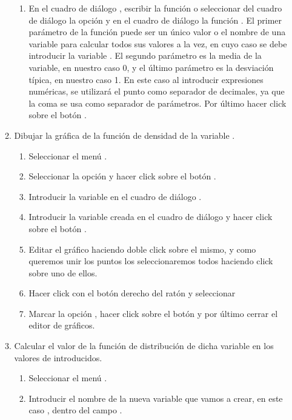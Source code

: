 \begin{enumerate}[leftmargin=*]
\begin{enumerate}
\begin{indicacion}
\begin{enumerate}
\item En el cuadro de diálogo , escribir la 
función  o seleccionar del cuadro 
de diálogo  la opción  y en el 
cuadro de diálogo  la 
función . El primer parámetro de la función 
 puede ser un único valor o el 
nombre de una variable para calcular todos sus valores a la vez, en cuyo 
caso se debe introducir la variable .
El segundo parámetro es la media de la variable, en nuestro caso 0, y el 
último parámetro es la desviación típica, en nuestro caso 1. En este caso 
al introducir expresiones numéricas, se utilizará el punto como 
separador de decimales, ya que la coma se usa como separador de 
parámetros. Por último hacer click sobre el botón .
\end{enumerate}
\end{indicacion}


\item Dibujar la gráfica de la función de densidad de la variable 
.
\begin{indicacion}
\begin{enumerate}
\item Seleccionar el menú .
\item Seleccionar la opción  y hacer click sobre el 
botón .
\item Introducir la variable  en el cuadro de diálogo 
.
\item Introducir la variable creada  en el cuadro 
de diálogo  y hacer click sobre el botón .
\item Editar el gráfico haciendo doble click sobre el mismo, y como 
queremos unir los puntos los seleccionaremos todos
haciendo click sobre uno de ellos.
\item Hacer click con el botón derecho del ratón y seleccionar 
\item Marcar la opción , hacer click sobre el botón 
 y por último cerrar el editor de gráficos.
\end{enumerate}
\end{indicacion}


\item  Calcular el valor de la función de distribución de dicha variable 
en los valores de  introducidos.
\begin{indicacion}
\begin{enumerate}
\item Seleccionar el menú .
\item Introducir el nombre de la nueva variable que vamos a crear, en 
este caso , dentro del campo 
.



\end{enumerate}
\end{indicacion}
\end{enumerate}
\end{enumerate}
